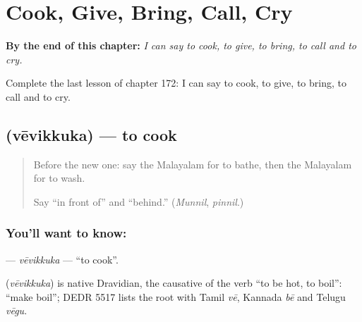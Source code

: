 
\chapter{Cook, Give, Bring, Call, Cry}
\label{ch:ml-cook-give-bring-call-cry}

\begin{chapteropening}
\textbf{By the end of this chapter:} \emph{I can say to cook, to give, to bring, to call and to cry.}

Complete the last lesson of chapter 172: I can say to cook, to give, to bring, to call and to cry.
\end{chapteropening}

\section[\texorpdfstring{\ml{വേവിക്കുക} (vēvikkuka)}{വേവിക്കുക (vēvikkuka)}]{ (vēvikkuka) — to cook}

\label{lesson:ML-C172-vevikkuka}



\begin{quote}
Before the new one: say the Malayalam for to bathe, then the Malayalam for to wash.

Say \textquotedblleft{}in front of\textquotedblright{} and \textquotedblleft{}behind.\textquotedblright{} (\emph{Munnil}, \emph{pinnil}.)
\end{quote}

\subsection*{You'll want to know: }
\textbf{} — \emph{vēvikkuka} — \textquotedblleft{}to cook\textquotedblright{}.

\begin{cousinweb}
\textbf{} (\emph{vēvikkuka}) is native Dravidian, the causative of the verb \textquotedblleft{}to be hot, to boil\textquotedblright{}: \textquotedblleft{}make boil\textquotedblright{}; DEDR 5517 lists the root with Tamil \emph{vē}, Kannada \emph{bē} and Telugu \emph{vēgu}.
\end{cousinweb}

